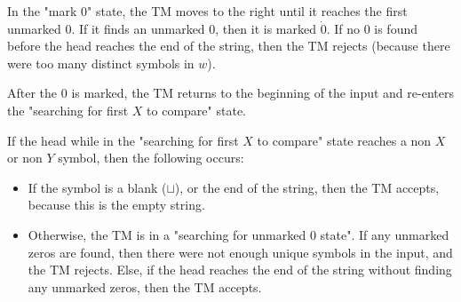 \documentclass[11pt,addpoints,answers]{exam}
\newcommand{\1}{\mathbf{1}}
\begin{document}
\medskip 

\noindent In the "mark 0" state, the TM moves to the right until it reaches the first unmarked $0$. If it finds an unmarked $0$, then it is marked $\dot{0}$. If no $0$ is found before the head reaches the end of the string, then the TM rejects (because there were too many distinct symbols in $w$).

\medskip 

\noindent After the $0$ is marked, the TM returns to the beginning of the input and re-enters the "searching for first $X$ to compare" state.

\medskip 

\noindent If the head while in the "searching for first $X$ to compare" state reaches a non $X$ or non $Y$ symbol, then the following occurs:

\begin{itemize}
\item If the symbol is a blank ($\sqcup$), or the end of the string, then the TM accepts, because this is the empty string.
\item Otherwise, the TM is in a "searching for unmarked $0$ state". If any unmarked zeros are found, then there were not enough unique symbols in the input, and the TM rejects. Else, if the head reaches the end of the string without finding any unmarked zeros, then the TM accepts.
\end{itemize}
\end{document}

